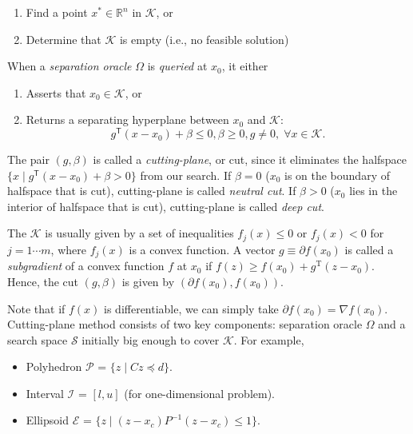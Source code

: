 \documentclass[final,leqno]{siamltex}
\providecommand{\tightlist}{%
  \setlength{\itemsep}{0pt}\setlength{\parskip}{0pt}}
\begin{document}
\begin{enumerate}
\def\labelenumi{\arabic{enumi}.}
\tightlist
\item
  Find a point \(x^* \in \mathbb{R}^n\) in \(\mathcal{K}\), or
\item
  Determine that \(\mathcal{K}\) is empty (i.e., no feasible solution)
\end{enumerate}

When a \emph{separation oracle} \(\Omega\) is \emph{queried} at \(x_0\), it either

\begin{enumerate}
\def\labelenumi{\arabic{enumi}.}
\tightlist
\item
  Asserts that \(x_0 \in \mathcal{K}\), or
\item
  Returns a separating hyperplane between \(x_0\) and \(\mathcal{K}\):
  \begin{equation}g^\mathsf{T} (x - x_0) + \beta \leq 0, \beta \geq 0, g \neq 0, \; \forall x \in \mathcal{K}.\label{eq:cut}\end{equation}
\end{enumerate}

The pair \((g, \beta)\) is called a \emph{cutting-plane}, or cut, since it eliminates the halfspace \(\{x \mid g^\mathsf{T} (x - x_0) + \beta > 0\}\) from our search. If \(\beta=0\) (\(x_0\) is on the boundary of halfspace that is cut), cutting-plane is called \emph{neutral cut}. If \(\beta>0\) (\(x_0\) lies in the interior of halfspace that is cut), cutting-plane is called \emph{deep cut}.

The \(\mathcal{K}\) is usually given by a set of inequalities \(f_j(x) \le 0\) or \(f_j(x) < 0\) for \(j = 1 \cdots m\), where \(f_j(x)\) is a convex function. A vector \(g \equiv \partial f(x_0)\) is called a \emph{subgradient} of a convex function \(f\) at \(x_0\) if \(f(z) \geq f(x_0) + g^\mathrm{T} (z - x_0)\). Hence, the cut \((g, \beta)\) is given by \((\partial f(x_0), f(x_0))\).

Note that if \(f(x)\) is differentiable, we can simply take \(\partial f(x_0) = \nabla f(x_0)\). Cutting-plane method consists of two key components: separation oracle \(\Omega\) and a search space \(\mathcal{S}\) initially big enough to cover \(\mathcal{K}\). For example,

\begin{itemize}
\tightlist
\item
  Polyhedron \(\mathcal{P}\) = \(\{z \mid C z \preceq d \}\).
\item
  Interval \(\mathcal{I}\) = \([l, u]\) (for one-dimensional problem).
\item
  Ellipsoid \(\mathcal{E}\) = \(\{z \mid (z-x_c)P^{-1}(z-x_c) \leq 1 \}\).
\end{itemize}
\end{document}
